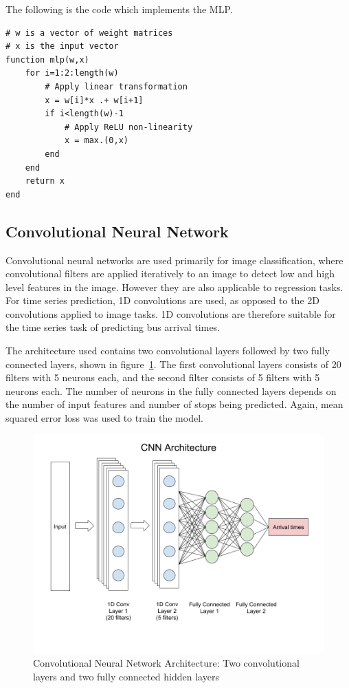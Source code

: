 The following is the code which implements the MLP.

\begin{lstlisting}
# w is a vector of weight matrices
# x is the input vector
function mlp(w,x)
    for i=1:2:length(w)
        # Apply linear transformation
        x = w[i]*x .+ w[i+1]
        if i<length(w)-1
            # Apply ReLU non-linearity
            x = max.(0,x)
        end
    end
    return x
end
\end{lstlisting}

\subsection{Convolutional Neural Network}

Convolutional neural networks are used primarily for image classification, where convolutional filters are applied iteratively to an image to detect low and high level features in the image.
However they are also applicable to regression tasks.
For time series prediction, 1D convolutions are used, as opposed to the 2D convolutions applied to image tasks.
1D convolutions are therefore suitable for the time series task of predicting bus arrival times.

The architecture used contains two convolutional layers followed by two fully connected layers, shown in figure~\ref{cnn_architecture}.
The first convolutional layers consists of 20 filters with 5 neurons each, and the second filter consists of 5 filters with 5 neurons each.
The number of neurons in the fully connected layers depends on the number of input features and number of stops being predicted.
Again, mean squared error loss was used to train the model.

\begin{figure}
\includegraphics[width=\linewidth]{images/cnn_architecture.png}
\caption{Convolutional Neural Network Architecture: Two convolutional layers and two fully connected hidden layers}
\label{cnn_architecture}
\end{figure}
\clearpage
\newpage

